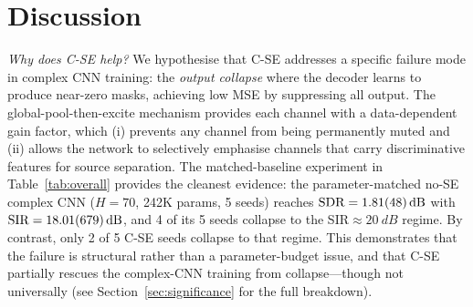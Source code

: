 \documentclass[twocolumn,english]{svjour3}
\begin{document}
\begin{table}[t]
    \centering
    \caption{Computational efficiency on an NVIDIA RTX 4060 (signal length $T=4096$). ``GPU time'' is per-sample latency at batch size 1 (averaged over 50 runs); throughput is reported in samples/sec at batch sizes 1, 16, 64; peak memory is recorded at batch size 16.}
    \label{tab:efficiency}
\end{table}

\section{Discussion}
\label{sec:discussion}

\begin{sloppypar}
\emph{Why does C-SE help?} We hypothesise that C-SE addresses a specific failure mode in complex CNN training: the \emph{output collapse} where the decoder learns to produce near-zero masks, achieving low MSE by suppressing all output. The global-pool-then-excite mechanism provides each channel with a data-dependent gain factor, which (i) prevents any channel from being permanently muted and (ii) allows the network to selectively emphasise channels that carry discriminative features for source separation. The matched-baseline experiment in Table~\ref{tab:overall} provides the cleanest evidence: the parameter-matched no-SE complex CNN ($H{=}70$, 242K params, 5 seeds) reaches $\text{SDR}=\SI{1.81 \pm 0.48}{dB}$ with $\text{SIR}=\SI{18.01 \pm 6.79}{dB}$, and 4 of its 5 seeds collapse to the SIR$\approx\SI{20}{dB}$ regime. By contrast, only 2 of 5 C-SE seeds collapse to that regime. This demonstrates that the failure is structural rather than a parameter-budget issue, and that C-SE partially rescues the complex-CNN training from collapse---though not universally (see Section~\ref{sec:significance} for the full breakdown).
\end{sloppypar}
\end{document}
